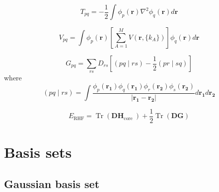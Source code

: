 \documentclass[final,3p,times,twocolumn]{elsarticle}
\begin{document}
	\begin{equation}
		T_{p q}=-\frac{1}{2} \int \phi_{p}(\mathbf{r}) \nabla^{2} \phi_{q}(\mathbf{r}) d \mathbf{r}
	\end{equation}

	\begin{equation}
		V_{p q}=\int \phi_{p}(\mathbf{r})
		\left[\sum_{A=1}^{M} 
		V(\mathbf r, \{k_A\})
		\right] \phi_{q}(\mathbf{r}) d \mathbf{r}
	\end{equation}
	
	\begin{equation}
		G_{p q}=\sum_{r s} D_{r s}\left[(p q \mid r s)-\frac{1}{2}(p r \mid s q)\right]
	\end{equation}
	where
	\begin{equation}
		(p q \mid r s)=
		\int \frac{
			\phi_{p}\left(\mathbf{r}_{\mathbf{1}}\right) \phi_{q}\left(\mathbf{r}_{\mathbf{1}}\right) \phi_{r}\left(\mathbf{r}_{\mathbf{2}}\right) \phi_{s}\left(\mathbf{r}_{\mathbf{2}}\right)}{\left|\mathbf{r}_{\mathbf{1}}-\mathbf{r}_{\mathbf{2}}\right|} d \mathbf{r}_{\mathbf{1}} d \mathbf{r}_{\mathbf{2}}
	\end{equation}

	\begin{equation}
		E_{\mathrm{RHF}}=\operatorname{Tr}\left(\mathbf{D H}_{\text {core }}\right)+\frac{1}{2} \operatorname{Tr}(\mathbf{D G})
	\end{equation}

	\section{Basis sets}
	\label{app:basissets}
	\subsection{Gaussian basis set}
	
	
	
	
	
	
	
	
	
	
	
\end{document}
